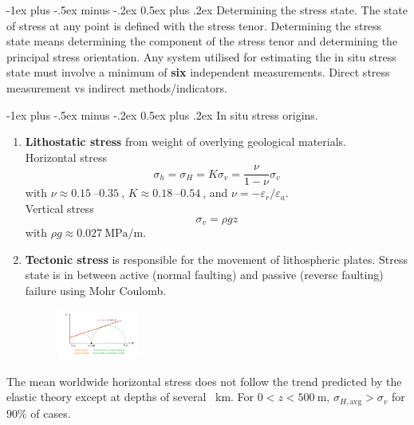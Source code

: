 \documentclass[10pt,landscape,a4paper]{article}
\makeatletter
\renewcommand{\section}{\@startsection{section}{1}{0mm}%
	{-1ex plus -.5ex minus -.2ex}%
	{0.5ex plus .2ex}%
	{\normalfont\large\bfseries}}
\makeatother
\begin{document}
\begin{multicols}{3}
	\section{Determining the stress state.}
	The state of stress at any point is defined with the stress tenor.
	Determining the stress state means determining the component of the stress tenor and determining the principal stress orientation.
	Any system utilised for estimating the in situ stress state must involve a minimum of \textbf{six} independent measurements.
	Direct stress measurement vs indirect methods/indicators.
	
	\section{In situ stress origins.}
	\begin{enumerate}
		\item \textbf{Lithostatic stress} from weight of overlying geological materials.\\
		      Horizontal stress
		      \[
			      \sigma_h=\sigma_H=K\sigma_v=\frac{\nu}{1-\nu}\sigma_v
		      \]
		      with $\nu\approx\SIrange{0.15}{0.35}{}$, $K\approx\SIrange{0.18}{0.54}{}$, and $\nu=-\varepsilon_r/\varepsilon_a$.\\
		      Vertical stress
		      \[
			      \sigma_v=\rho gz
		      \]
		      with $\rho g\approx\SI{0.027}{\mega\pascal\per\meter}$.
		\item \textbf{Tectonic stress} is responsible for the movement of lithospheric plates.
		      Stress state is in between active (normal faulting) and passive (reverse faulting) failure using Mohr Coulomb.
		      \begin{figure}[H]
			      \centering
			      \includegraphics[width=0.25\textwidth]{tectonic-stress}
		      \end{figure}
	\end{enumerate}
	The mean worldwide horizontal stress does not follow the trend predicted by the elastic theory except at depths of several \SI{}{\kilo\meter}. For $0<z<\SI{500}{\meter}$, $\sigma_{H,\text{avg}}>\sigma_v$ for $90\%$ of cases.
	

\end{multicols}
\end{document}

